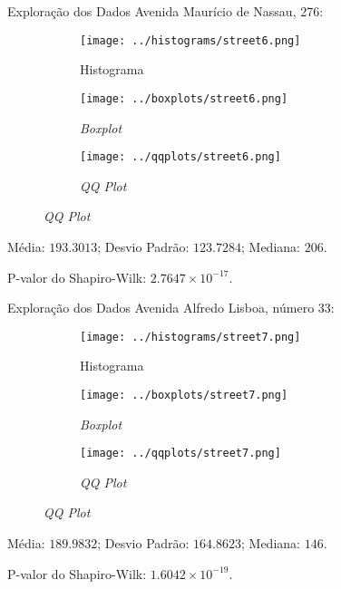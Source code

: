 \begin{frame}{Exploração dos Dados}
Avenida Maurício de Nassau, 276:
\vskip 0.05cm
\begin{figure}
	\centering
	\begin{subfigure}{.33\textwidth}
		\centering
		\texttt{[image: ../histograms/street6.png]}
		\caption*{Histograma}
	\end{subfigure}%
	\begin{subfigure}{.33\textwidth}
		\centering
		\texttt{[image: ../boxplots/street6.png]}
		\caption*{\textit{Boxplot}}
	\end{subfigure}
	\begin{subfigure}{.32\textwidth}
		\centering
		\texttt{[image: ../qqplots/street6.png]}
		\caption*{\textit{QQ Plot}}
	\end{subfigure}
\end{figure}
\vskip 0.05cm
Média: $193.3013$; Desvio Padrão: $123.7284$; Mediana: $206$.

P-valor do Shapiro-Wilk: $2.7647 \times 10^{-17}$.
\end{frame}

\begin{frame}{Exploração dos Dados}
Avenida Alfredo Lisboa, número 33:
\vskip 0.05cm
\begin{figure}
	\centering
	\begin{subfigure}{.33\textwidth}
		\centering
		\texttt{[image: ../histograms/street7.png]}
		\caption*{Histograma}
	\end{subfigure}%
	\begin{subfigure}{.33\textwidth}
		\centering
		\texttt{[image: ../boxplots/street7.png]}
		\caption*{\textit{Boxplot}}
	\end{subfigure}
	\begin{subfigure}{.32\textwidth}
		\centering
		\texttt{[image: ../qqplots/street7.png]}
		\caption*{\textit{QQ Plot}}
	\end{subfigure}
\end{figure}
\vskip 0.05cm
Média: $189.9832$; Desvio Padrão: $164.8623$; Mediana: $146$.

P-valor do Shapiro-Wilk: $1.6042 \times 10^{-19}$.
\end{frame}

